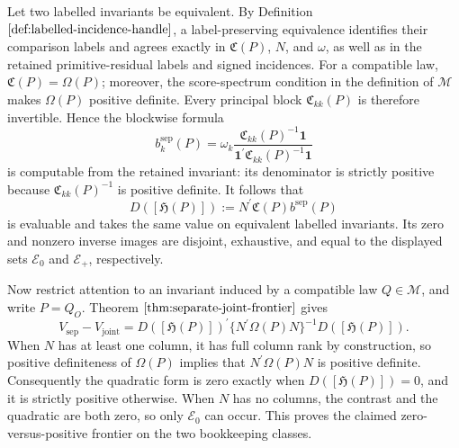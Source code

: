 Let two labelled invariants be equivalent. By Definition \(\ref{def:labelled-incidence-handle}\), a label-preserving equivalence identifies their comparison labels and agrees exactly in \(\mathfrak C(P)\), \(N\), and \(\omega\), as well as in the retained primitive-residual labels and signed incidences. For a compatible law, \(\mathfrak C(P)=\Omega(P)\); moreover, the score-spectrum condition in the definition of \(\mathcal M\) makes \(\Omega(P)\) positive definite. Every principal block \(\mathfrak C_{kk}(P)\) is therefore invertible. Hence the blockwise formula
\[
 b_k^{\mathrm{sep}}(P)
 =\omega_k\frac{\mathfrak C_{kk}(P)^{-1}\mathbf 1}
 {\mathbf 1^{\prime}\mathfrak C_{kk}(P)^{-1}\mathbf 1}
\]
is computable from the retained invariant: its denominator is strictly positive because \(\mathfrak C_{kk}(P)^{-1}\) is positive definite. It follows that
\[
 D([\mathfrak H(P)])
 :=N^{\prime}\mathfrak C(P)b^{\mathrm{sep}}(P)
\]
is evaluable and takes the same value on equivalent labelled invariants. Its zero and nonzero inverse images are disjoint, exhaustive, and equal to the displayed sets \(\mathscr E_0\) and \(\mathscr E_+\), respectively.

Now restrict attention to an invariant induced by a compatible law \(Q\in\mathcal M\), and write \(P=Q_O\). Theorem \(\ref{thm:separate-joint-frontier}\) gives
\[
 V_{\mathrm{sep}}-V_{\mathrm{joint}}
 =D([\mathfrak H(P)])^{\prime}
 \{N^{\prime}\Omega(P)N\}^{-1}
 D([\mathfrak H(P)]).
\]
When \(N\) has at least one column, it has full column rank by construction, so positive definiteness of \(\Omega(P)\) implies that \(N^{\prime}\Omega(P)N\) is positive definite. Consequently the quadratic form is zero exactly when \(D([\mathfrak H(P)])=0\), and it is strictly positive otherwise. When \(N\) has no columns, the contrast and the quadratic are both zero, so only \(\mathscr E_0\) can occur. This proves the claimed zero-versus-positive frontier on the two bookkeeping classes.

